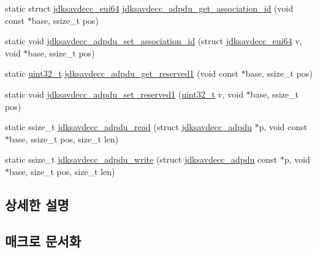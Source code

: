 \begin{DoxyCompactItemize}
\item 
static struct \hyperlink{structjdksavdecc__eui64}{jdksavdecc\+\_\+eui64} \hyperlink{group__adpdu_ga033e6dd0b16beee436f9d8cb2c0bfd70}{jdksavdecc\+\_\+adpdu\+\_\+get\+\_\+association\+\_\+id} (void const $\ast$base, ssize\+\_\+t pos)
\item 
static void \hyperlink{group__adpdu_gaf4bccd19420ecaf3e6e6af60d65b7960}{jdksavdecc\+\_\+adpdu\+\_\+set\+\_\+association\+\_\+id} (struct \hyperlink{structjdksavdecc__eui64}{jdksavdecc\+\_\+eui64} v, void $\ast$base, ssize\+\_\+t pos)
\item 
static \hyperlink{parse_8c_a6eb1e68cc391dd753bc8ce896dbb8315}{uint32\+\_\+t} \hyperlink{group__adpdu_ga855228a4d0b00d861cc77b79afa6f52b}{jdksavdecc\+\_\+adpdu\+\_\+get\+\_\+reserved1} (void const $\ast$base, ssize\+\_\+t pos)
\item 
static void \hyperlink{group__adpdu_ga893e8d0562062deb4633add9cd760f24}{jdksavdecc\+\_\+adpdu\+\_\+set\+\_\+reserved1} (\hyperlink{parse_8c_a6eb1e68cc391dd753bc8ce896dbb8315}{uint32\+\_\+t} v, void $\ast$base, ssize\+\_\+t pos)
\item 
static ssize\+\_\+t \hyperlink{group__adpdu_ga0b7b4807db97c9d3deaeed3b8b11adc1}{jdksavdecc\+\_\+adpdu\+\_\+read} (struct \hyperlink{structjdksavdecc__adpdu}{jdksavdecc\+\_\+adpdu} $\ast$p, void const $\ast$base, ssize\+\_\+t pos, size\+\_\+t len)
\item 
static ssize\+\_\+t \hyperlink{group__adpdu_ga7bd0ab3bb99e42c12c7472678a4a00ca}{jdksavdecc\+\_\+adpdu\+\_\+write} (struct \hyperlink{structjdksavdecc__adpdu}{jdksavdecc\+\_\+adpdu} const $\ast$p, void $\ast$base, size\+\_\+t pos, size\+\_\+t len)
\end{DoxyCompactItemize}


\subsection{상세한 설명}


\subsection{매크로 문서화}
